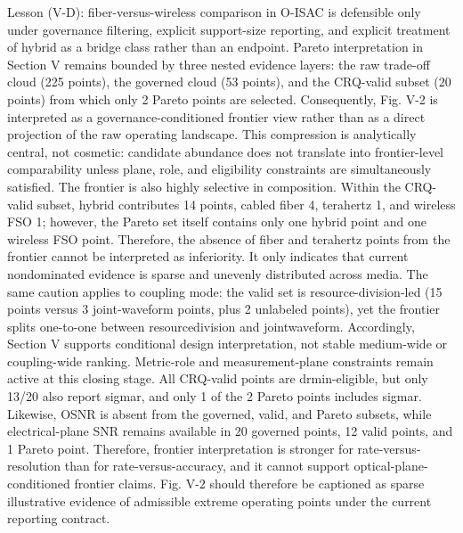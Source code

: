 {}Lesson (V-D): fiber-versus-wireless comparison in O-ISAC is defensible only under governance filtering, explicit support-size reporting, and explicit treatment of hybrid as a bridge class rather than an endpoint.\markdownRendererParagraphSeparator
{} Pareto interpretation in Section V remains bounded by three nested evidence layers: the raw trade-off cloud (225 points), the governed cloud (53 points), and the CRQ-valid subset (20 points) from which only 2 Pareto points are selected. Consequently, Fig. V-2 is interpreted as a governance-conditioned frontier view rather than as a direct projection of the raw operating landscape. This compression is analytically central, not cosmetic: candidate abundance does not translate into frontier-level comparability unless plane, role, and eligibility constraints are simultaneously satisfied.\markdownRendererParagraphSeparator
{}The frontier is also highly selective in composition. Within the CRQ-valid subset, hybrid contributes 14 points, cabled fiber 4, terahertz 1, and wireless FSO 1; however, the Pareto set itself contains only one hybrid point and one wireless FSO point. Therefore, the absence of fiber and terahertz points from the frontier cannot be interpreted as inferiority. It only indicates that current nondominated evidence is sparse and unevenly distributed across media. The same caution applies to coupling mode: the valid set is resource-division-led (15 points versus 3 joint-waveform points, plus 2 unlabeled points), yet the frontier splits one-to-one between resource\markdownRendererUnderscore{}division and joint\markdownRendererUnderscore{}waveform. Accordingly, Section V supports conditional design interpretation, not stable medium-wide or coupling-wide ranking.\markdownRendererParagraphSeparator
{}Metric-role and measurement-plane constraints remain active at this closing stage. All CRQ-valid points are drmin-eligible, but only 13/20 also report sigma\markdownRendererUnderscore{}r, and only 1 of the 2 Pareto points includes sigma\markdownRendererUnderscore{}r. Likewise, OSNR is absent from the governed, valid, and Pareto subsets, while electrical-plane SNR remains available in 20 governed points, 12 valid points, and 1 Pareto point. Therefore, frontier interpretation is stronger for rate-versus-resolution than for rate-versus-accuracy, and it cannot support optical-plane-conditioned frontier claims. Fig. V-2 should therefore be captioned as sparse illustrative evidence of admissible extreme operating points under the current reporting contract.\markdownRendererParagraphSeparator
